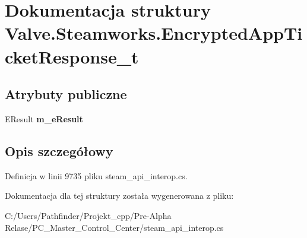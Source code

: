 \hypertarget{struct_valve_1_1_steamworks_1_1_encrypted_app_ticket_response__t}{}\section{Dokumentacja struktury Valve.\+Steamworks.\+Encrypted\+App\+Ticket\+Response\+\_\+t}
\label{struct_valve_1_1_steamworks_1_1_encrypted_app_ticket_response__t}
\subsection*{Atrybuty publiczne}
\begin{DoxyCompactItemize}
\item 
\mbox{\label{struct_valve_1_1_steamworks_1_1_encrypted_app_ticket_response__t_a6aa1a5f004c5738b6ddae1b35f839423}} 
E\+Result {\bfseries m\+\_\+e\+Result}
\end{DoxyCompactItemize}


\subsection{Opis szczegółowy}


Definicja w linii 9735 pliku steam\+\_\+api\+\_\+interop.\+cs.



Dokumentacja dla tej struktury została wygenerowana z pliku\+:\begin{DoxyCompactItemize}
\item 
C\+:/\+Users/\+Pathfinder/\+Projekt\+\_\+cpp/\+Pre-\/\+Alpha Relase/\+P\+C\+\_\+\+Master\+\_\+\+Control\+\_\+\+Center/steam\+\_\+api\+\_\+interop.\+cs\end{DoxyCompactItemize}
